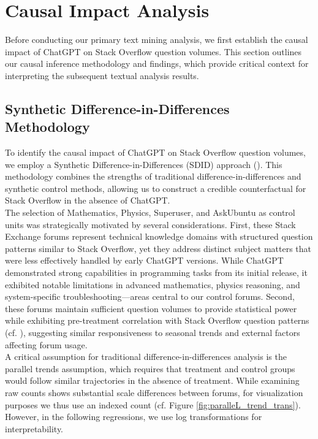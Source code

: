 \section{Causal Impact Analysis}
Before conducting our primary text mining analysis, we first establish the causal impact of ChatGPT on Stack Overflow question volumes. This section outlines our causal inference methodology and findings, which provide critical context for interpreting the subsequent textual analysis results.


\subsection{Synthetic Difference-in-Differences Methodology}
To identify the causal impact of ChatGPT on Stack Overflow question volumes, we employ a Synthetic Difference-in-Differences (SDID) approach (\cite{arkhangelsky_synthetic_2021}). This methodology combines the strengths of traditional difference-in-differences and synthetic control methods, allowing us to construct a credible counterfactual for Stack Overflow in the absence of ChatGPT.\\

The selection of Mathematics, Physics, Superuser, and AskUbuntu as control units was strategically motivated by several considerations. First, these Stack Exchange forums represent technical knowledge domains with structured question patterns similar to Stack Overflow, yet they address distinct subject matters that were less effectively handled by early ChatGPT versions. While ChatGPT demonstrated strong capabilities in programming tasks from its initial release, it exhibited notable limitations in advanced mathematics, physics reasoning, and system-specific troubleshooting—areas central to our control forums. Second, these forums maintain sufficient question volumes to provide statistical power while exhibiting pre-treatment correlation with Stack Overflow question patterns (cf. ), suggesting similar responsiveness to seasonal trends and external factors affecting forum usage.\\

A critical assumption for traditional difference-in-differences analysis is the parallel trends assumption, which requires that treatment and control groups would follow similar trajectories in the absence of treatment. While examining raw counts shows substantial scale differences between forums, for visualization purposes we thus use an indexed count (cf. Figure \ref{fig:paralleL_trend_trans}). However, in the following regressions, we use log transformations for interpretability.\\

